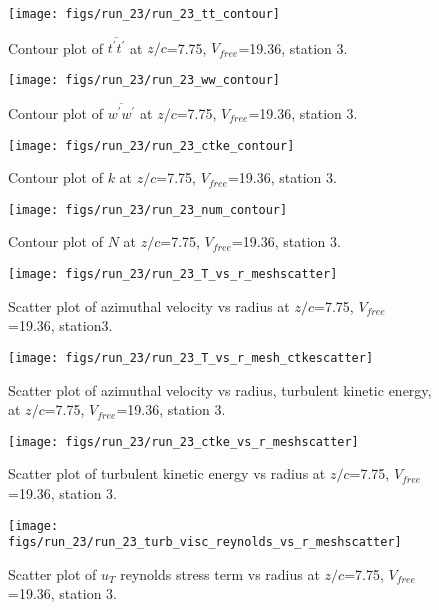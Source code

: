 \begin{figure}[H]
\centering
\texttt{[image: figs/run\_23/run\_23\_tt\_contour]}
\caption{Contour plot of $\overline{t^\prime t^\prime}$ at $z/c$=7.75, $V_{free}$=19.36, station 3.}
\end{figure}


\begin{figure}[H]
\centering
\texttt{[image: figs/run\_23/run\_23\_ww\_contour]}
\caption{Contour plot of $\overline{w^\prime w^\prime}$ at $z/c$=7.75, $V_{free}$=19.36, station 3.}
\end{figure}


\begin{figure}[H]
\centering
\texttt{[image: figs/run\_23/run\_23\_ctke\_contour]}
\caption{Contour plot of $k$ at $z/c$=7.75, $V_{free}$=19.36, station 3.}
\end{figure}


\begin{figure}[H]
\centering
\texttt{[image: figs/run\_23/run\_23\_num\_contour]}
\caption{Contour plot of $N$ at $z/c$=7.75, $V_{free}$=19.36, station 3.}
\end{figure}


\begin{figure}[H]
\centering
\texttt{[image: figs/run\_23/run\_23\_T\_vs\_r\_meshscatter]}
\caption{Scatter plot of azimuthal velocity vs radius at $z/c$=7.75, $V_{free}$=19.36, station3.}
\end{figure}


\begin{figure}[H]
\centering
\texttt{[image: figs/run\_23/run\_23\_T\_vs\_r\_mesh\_ctkescatter]}
\caption{Scatter plot of azimuthal velocity vs radius, turbulent kinetic energy, at $z/c$=7.75, $V_{free}$=19.36, station 3.}
\end{figure}


\begin{figure}[H]
\centering
\texttt{[image: figs/run\_23/run\_23\_ctke\_vs\_r\_meshscatter]}
\caption{Scatter plot of turbulent kinetic energy vs radius at $z/c$=7.75, $V_{free}$=19.36, station 3.}
\end{figure}


\begin{figure}[H]
\centering
\texttt{[image: figs/run\_23/run\_23\_turb\_visc\_reynolds\_vs\_r\_meshscatter]}
\caption{Scatter plot of $
u_T$ reynolds stress term vs radius at $z/c$=7.75, $V_{free}$=19.36, station 3.}
\end{figure}


